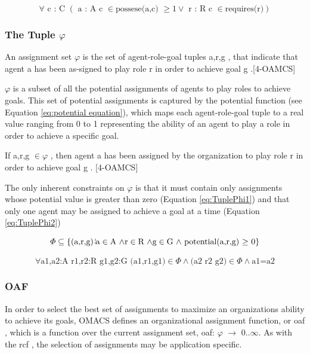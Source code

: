 \begin{equation}
\forall\textrm{ c : C }\left(\textrm{ a : A c }\in\textrm{possese(a,c) }\geq1\lor\textrm{ r : R c }\in\textrm{requires(r)}\right)\label{eq : capabilities}
\end{equation}


\subsubsection{ The Tuple  $\varphi$ } 
An assignment set $\varphi$ is the set of agent-role-goal tuples  \textlangle{} a,r,g \textrangle{} , that indicate that agent a has been as-signed to play role r in order to achieve goal g .[4-OAMCS]

$\varphi$ is a subset of all the potential assignments of agents to play roles to achieve goals. This set of potential assignments is captured by the potential function (see Equation \ref{eq:potential equation}), which maps each agent-role-goal tuple to a real value ranging from 0 to 1 representing the ability of an agent to play a role in order to achieve a specific goal.
	  
If \textlangle a,r,g \textrangle $\in \varphi$ , then agent a has been assigned by the organization to play role r in order to achieve goal g . [4-OAMCS]

The only inherent constraints on $\varphi$ is that it must contain only assignments whose potential value is greater than zero (Equation \ref{eq:TuplePhi1}) and that only one agent may be assigned to achieve a goal at a time (Equation \ref{eq:TuplePhi2})		


\begin{equation}
\varPhi\subseteq\left\{ \left(\textrm{a,r,g}\right)\brokenvert\textrm{a}\in\textrm{A \ensuremath{\land}}\textrm{r}\in\textrm{R \ensuremath{\land\textrm{g}\in\textrm{G \ensuremath{\land} \textrm{potential(a,r,g) \ensuremath{\ge} 0}}}}\right\} 
\label{eq:TuplePhi1}
\end{equation}

\begin{equation}
\forall\textrm{a1,a2:A r1,r2:R g1,g2:G (a1,r1,g1)}\in\varPhi\land\textrm{(a2 r2 g2)}\in\varPhi\land\textrm{a1=a2}\label{eq:TuplePhi2}
\end{equation}

 		
 

\subsubsection{ OAF }
	In order to select the best set of assignments to maximize an organizations ability to achieve its goals, OMACS defines an organizational assignment function, or oaf , which is a function over the current assignment set, oaf: $\varphi$ $\rightarrow$ 0..$\infty$. As with the rcf , the selection of assignments may be application specific. \cite{omacs4}
	
